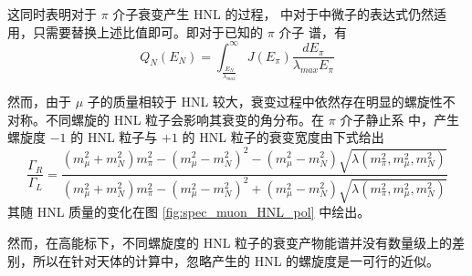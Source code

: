 \documentclass[printMode=false, declarePage=false]{ecnuthesis}
\begin{document}
这同时表明对于 $\pi$ 介子衰变产生 HNL 的过程，\parencite{kelner2006energy} 中对于中微子的表达式仍然适用，只需要替换上述比值即可。即对于已知的 $\pi$ 介子
谱，有
\begin{equation}
  Q_{N}(E_N) = \int_{\frac{E_N}{\lambda_{max}}}^{\infty} J(E_\pi) \frac{d E_\pi}{\lambda_{max} E_\pi} \label{eq:hnl_spec_from_pion}
\end{equation}

然而，由于 $\mu$ 子的质量相较于 HNL 较大，衰变过程中依然存在明显的螺旋性不对称。不同螺旋的 HNL 粒子会影响其衰变的角分布。在 $\pi$ 介子静止系
中，产生螺旋度 $-1$ 的 HNL 粒子与 $+1$ 的 HNL 粒子的衰变宽度由下式给出
\begin{equation}
  \frac{\Gamma_R}{\Gamma_L} = \frac{(m_\mu^2 + m_N^2) m_\pi^2 - (m_\mu^2 - m_N^2)^2 - (m_\mu^2 - m_N^2) \sqrt{\lambda(m_\pi^2, m_\mu^2, m_N^2)}}
  {(m_\mu^2 + m_N^2) m_\pi^2 - (m_\mu^2 - m_N^2)^2 + (m_\mu^2 - m_N^2) \sqrt{\lambda(m_\pi^2, m_\mu^2, m_N^2)}} \label{eq:hnl_hel_pion}
\end{equation}
其随 HNL 质量的变化在图 \ref{fig:spec_muon_HNL_pol} 中绘出。

然而，在高能标下，不同螺旋度的 HNL 粒子的衰变产物能谱并没有数量级上的差别，所以在针对天体的计算中，忽略产生的 HNL 的螺旋度是一可行的近似。
\end{document}
